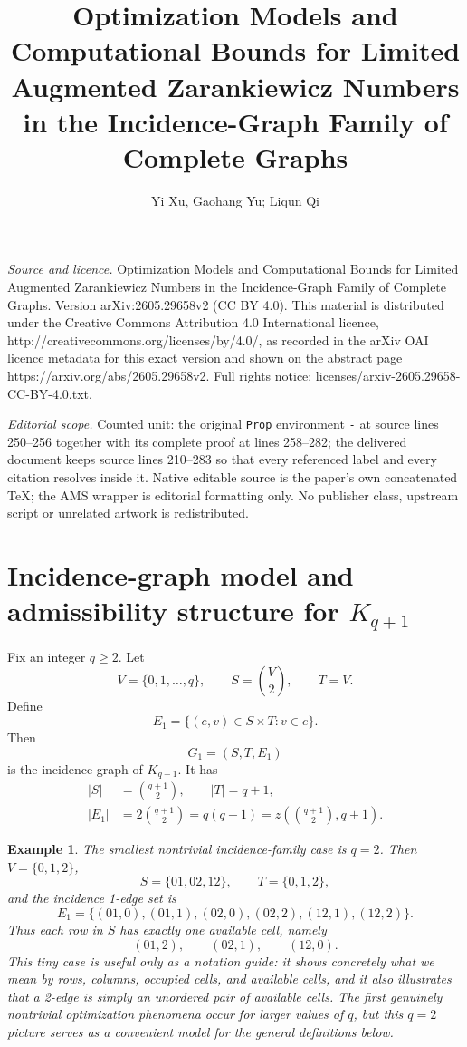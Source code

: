 \documentclass[10pt,a4paper]{amsart}
\newcommand{\0}{\mathbf{0}}
\newcommand{\1}{\mathbf{1}}
\newtheorem{example}[Thm]{Example}
\begin{document}
\title[Optimization Models and Computational Bounds for Limited Aug]{Optimization Models and Computational Bounds for Limited Augmented Zarankiewicz Numbers in the Incidence-Graph Family of Complete Graphs}
\author{Yi Xu, Gaohang Yu; Liqun Qi}
\date{}
\maketitle
\noindent\emph{Source and licence.} Optimization Models and Computational Bounds for Limited Augmented Zarankiewicz Numbers in the Incidence-Graph Family of Complete Graphs. Version arXiv:2605.29658v2 (CC BY 4.0). This material is distributed under the Creative Commons Attribution 4.0 International licence, http://creativecommons.org/licenses/by/4.0/, as recorded in the arXiv OAI licence metadata for this exact version and shown on the abstract page https://arxiv.org/abs/2605.29658v2. Full rights notice: licenses/arxiv-2605.29658-CC-BY-4.0.txt.\par\smallskip
\noindent\textit{Editorial scope.} Counted unit: the original \texttt{Prop} environment \texttt{-} at source lines 250--256 together with its complete proof at lines 258--282; the delivered document keeps source lines 210--283 so that every referenced label and every citation resolves inside it. Native editable source is the paper's own concatenated TeX; the AMS wrapper is editorial formatting only. No publisher class, upstream script or unrelated artwork is redistributed.
\section{Incidence-graph model and admissibility structure for \(K_{q+1}\)}

Fix an integer \(q\ge 2\). Let
\[
V=\{0,1,\dots,q\},\qquad S=\binom{V}{2},\qquad T=V.
\]
Define
\[
E_1=\{(e,v)\in S\times T: v\in e\}.
\]
Then
\[
G_1=(S,T,E_1)
\]
is the incidence graph of \(K_{q+1}\). It has
\[
\begin{aligned}
|S|&=\binom{q+1}{2},\qquad |T|=q+1,\\
|E_1|&=2\binom{q+1}{2}=q(q+1)=z\!\left(\binom{q+1}{2},q+1\right).
\end{aligned}
\]

\begin{example}
{The smallest nontrivial incidence-family case is \(q=2\). Then \(V=\{0,1,2\}\),}
\[
{S=\{01,02,12\},\qquad T=\{0,1,2\},}
\]
{and the incidence 1-edge set is}
\[
{E_1=\{(01,0),(01,1),(02,0),(02,2),(12,1),(12,2)\}.}
\]
{Thus each row in \(S\) has exactly one available cell, namely}
\[
{(01,2),\qquad (02,1),\qquad (12,0).}
\]
{This tiny case is useful only as a notation guide: it shows concretely what we mean by rows, columns, occupied cells, and available cells, and it also illustrates that a 2-edge is simply an unordered pair of available cells. The first genuinely nontrivial optimization phenomena occur for larger values of \(q\), but this \(q=2\) picture serves as a convenient model for the general definitions below.}
\end{example}
\end{document}
